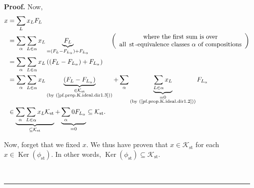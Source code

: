 \documentclass[numbers=enddot,12pt,final,onecolumn,notitlepage]{scrartcl}%
\theoremstyle{definition}
\newenvironment{proof}[1][Proof]{\noindent\textbf{#1.} }{\ \rule{0.5em}{0.5em}}
\let\sumnonlimits\sum
\renewcommand{\sum}{\sumnonlimits\limits}
\begin{document}
\begin{proof}
Now,%
\begin{align*}
x  &  =\sum_{L}x_{L}F_{L}\\
&  =\sum_{\alpha}\sum_{L\in\alpha}x_{L}\underbrace{F_{L}}_{=\left(
F_{L}-F_{L_{\alpha}}\right)  +F_{L_{\alpha}}}\ \ \ \ \ \ \ \ \ \ \left(
\begin{array}
[c]{c}%
\text{where the first sum is over}\\
\text{all }\operatorname*{st}\text{-equivalence classes }\alpha\text{ of
compositions}%
\end{array}
\right) \\
&  =\sum_{\alpha}\sum_{L\in\alpha}x_{L}\left(  \left(  F_{L}-F_{L_{\alpha}%
}\right)  +F_{L_{\alpha}}\right) \\
&  =\sum_{\alpha}\sum_{L\in\alpha}x_{L}\underbrace{\left(  F_{L}-F_{L_{\alpha
}}\right)  }_{\substack{\in\mathcal{K}_{\operatorname*{st}}\\\text{(by
(\ref{pf.prop.K.ideal.dir1.3}))}}}+\sum_{\alpha}\underbrace{\sum_{L\in\alpha
}x_{L}}_{\substack{=0\\\text{(by (\ref{pf.prop.K.ideal.dir1.2}))}%
}}F_{L_{\alpha}}\\
&  \in\underbrace{\sum_{\alpha}\sum_{L\in\alpha}x_{L}\mathcal{K}%
_{\operatorname*{st}}}_{\subseteq\mathcal{K}_{\operatorname*{st}}%
}+\underbrace{\sum_{\alpha}0F_{L_{\alpha}}}_{=0}\subseteq\mathcal{K}%
_{\operatorname*{st}}.
\end{align*}


Now, forget that we fixed $x$. We thus have proven that $x\in\mathcal{K}%
_{\operatorname*{st}}$ for each $x\in\operatorname*{Ker}\left(  \phi
_{\operatorname*{st}}\right)  $. In other words, $\operatorname*{Ker}\left(
\phi_{\operatorname*{st}}\right)  \subseteq\mathcal{K}_{\operatorname*{st}}$.


\end{proof}
\end{document}
